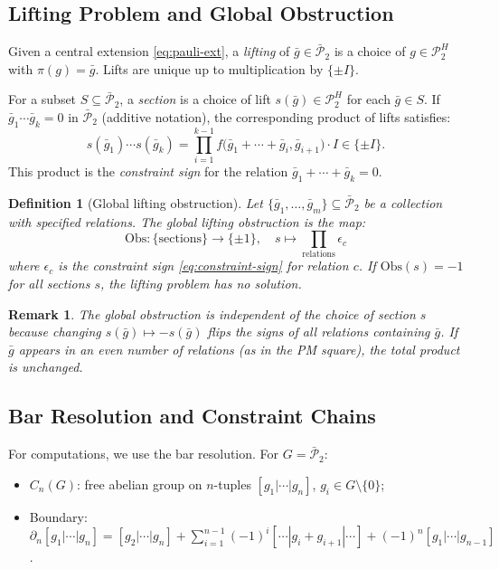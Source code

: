 \documentclass[11pt]{article}
\newtheorem{definition}[theorem]{Definition}
\newtheorem{remark}[theorem]{Remark}
\begin{document}
\subsection{Lifting Problem and Global Obstruction}
\label{sec:lifting}

Given a central extension \eqref{eq:pauli-ext}, a \emph{lifting} of
$\bar{g} \in \bar{\mathcal{P}}_2$ is a choice of $g \in \mathcal{P}_2^H$
with $\pi(g) = \bar{g}$. Lifts are unique up to multiplication by
$\{\pm I\}$.

For a subset $S \subseteq \bar{\mathcal{P}}_2$, a \emph{section} is a
choice of lift $s(\bar{g}) \in \mathcal{P}_2^H$ for each $\bar{g} \in S$.
If $\bar{g}_1 \cdots \bar{g}_k = 0$ in $\bar{\mathcal{P}}_2$ (additive
notation), the corresponding product of lifts satisfies:
\begin{equation}
\label{eq:constraint-sign}
  s(\bar{g}_1) \cdots s(\bar{g}_k)
  = \prod_{i=1}^{k-1} f\bigl(\bar{g}_1 + \cdots + \bar{g}_i, \bar{g}_{i+1}\bigr)
  \cdot I \in \{\pm I\}.
\end{equation}
This product is the \emph{constraint sign} for the relation
$\bar{g}_1 + \cdots + \bar{g}_k = 0$.

\begin{definition}[Global lifting obstruction]
\label{def:global-obs}
Let $\{\bar{g}_1, \ldots, \bar{g}_m\} \subseteq \bar{\mathcal{P}}_2$ be a
collection with specified relations. The \emph{global lifting
obstruction} is the map:
\[
  \text{Obs}: \{\text{sections}\} \longrightarrow \{\pm 1\},
  \quad s \mapsto \prod_{\text{relations}} \epsilon_c
\]
where $\epsilon_c$ is the constraint sign \eqref{eq:constraint-sign}
for relation $c$. If $\text{Obs}(s) = -1$ for all sections $s$, the
lifting problem has no solution.
\end{definition}

\begin{remark}
The global obstruction is independent of the choice of section $s$
because changing $s(\bar{g}) \mapsto -s(\bar{g})$ flips the signs of all
relations containing $\bar{g}$. If $\bar{g}$ appears in an even number
of relations (as in the PM square), the total product is unchanged.
\end{remark}

\subsection{Bar Resolution and Constraint Chains}
\label{sec:bar}

For computations, we use the bar resolution. For $G = \bar{\mathcal{P}}_2$:
\begin{itemize}
\item $C_n(G)$: free abelian group on $n$-tuples $[g_1|\cdots|g_n]$,
      $g_i \in G \setminus \{0\}$;
\item Boundary: $\partial_n[g_1|\cdots|g_n] = [g_2|\cdots|g_n] +
      \sum_{i=1}^{n-1} (-1)^i[\cdots|g_i+g_{i+1}|\cdots] + (-1)^n[g_1|\cdots|g_{n-1}]$.
\end{itemize}
\end{document}
